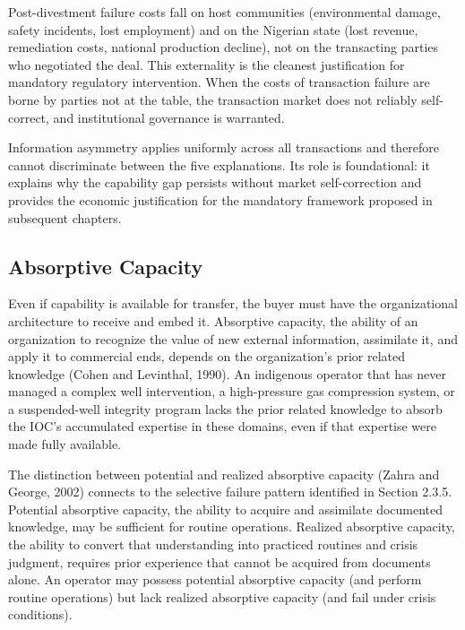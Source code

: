 \documentclass[twoside,fontset=lmodern]{mitthesis}
\begin{document}
Post-divestment failure costs fall on host communities (environmental
damage, safety incidents, lost employment) and on the Nigerian state
(lost revenue, remediation costs, national production decline), not on
the transacting parties who negotiated the deal. This externality is the
cleanest justification for mandatory regulatory intervention. When the
costs of transaction failure are borne by parties not at the table, the
transaction market does not reliably self-correct, and institutional
governance is warranted.

Information asymmetry applies uniformly across all transactions and
therefore cannot discriminate between the five explanations. Its role is
foundational: it explains why the capability gap persists without market
self-correction and provides the economic justification for the
mandatory framework proposed in subsequent chapters.

\hypertarget{absorptive-capacity}{%
\subsection{Absorptive Capacity}\label{absorptive-capacity}}

Even if capability is available for transfer, the buyer must have the
organizational architecture to receive and embed it. Absorptive
capacity, the ability of an organization to recognize the value of new
external information, assimilate it, and apply it to commercial ends,
depends on the organization's prior related knowledge (Cohen and
Levinthal, 1990). An indigenous operator that has never managed a
complex well intervention, a high-pressure gas compression system, or a
suspended-well integrity program lacks the prior related knowledge to
absorb the IOC's accumulated expertise in these domains, even if that
expertise were made fully available.

The distinction between potential and realized absorptive capacity
(Zahra and George, 2002) connects to the selective failure pattern
identified in Section 2.3.5. Potential absorptive capacity, the ability
to acquire and assimilate documented knowledge, may be sufficient for
routine operations. Realized absorptive capacity, the ability to convert
that understanding into practiced routines and crisis judgment, requires
prior experience that cannot be acquired from documents alone. An
operator may possess potential absorptive capacity (and perform routine
operations) but lack realized absorptive capacity (and fail under crisis
conditions).
\end{document}
